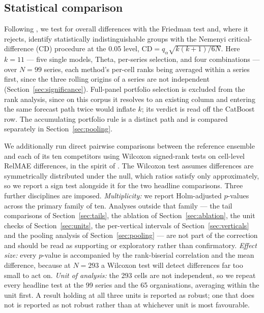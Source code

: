 \documentclass[11pt]{article}
\begin{document}
\subsection{Statistical comparison}
\label{sec:stats}

Following \citet{demsar2006}, we test for overall differences with the Friedman test and, where it rejects, identify statistically indistinguishable groups with the Nemenyi critical-difference (CD) procedure at the 0.05 level, $\mathrm{CD} = q_\alpha \sqrt{k(k+1)/6N}$. Here $k = 11$ --- five single models, Theta, per-series selection, and four combinations --- over $N = 99$ series, each method's per-cell ranks being averaged within a series first, since the three rolling origins of a series are not independent (Section~\ref{sec:significance}). Full-panel portfolio selection is excluded from the rank analysis, since on this corpus it resolves to an existing column and entering the same forecast path twice would inflate $k$; its verdict is read off the CatBoost row. The accumulating portfolio rule is a distinct path and is compared separately in Section~\ref{sec:pooling}.

We additionally run direct pairwise comparisons between the reference ensemble and each of its ten competitors using Wilcoxon signed-rank tests on cell-level RelMAE differences, in the spirit of \citet{diebold1995}. The Wilcoxon test assumes differences are symmetrically distributed under the null, which ratios satisfy only approximately, so we report a sign test alongside it for the two headline comparisons. Three further disciplines are imposed. \emph{Multiplicity:} we report Holm-adjusted $p$-values across the primary family of ten. Analyses outside that family --- the tail comparisons of Section~\ref{sec:tails}, the ablation of Section~\ref{sec:ablation}, the unit checks of Section~\ref{sec:units}, the per-vertical intervals of Section~\ref{sec:verticals} and the pooling analysis of Section~\ref{sec:pooling} --- are not part of the correction and should be read as supporting or exploratory rather than confirmatory. \emph{Effect size:} every $p$-value is accompanied by the rank-biserial correlation and the mean difference, because at $N = 293$ a Wilcoxon test will detect differences far too small to act on. \emph{Unit of analysis:} the 293 cells are not independent, so we repeat every headline test at the 99 series and the 65 organisations, averaging within the unit first. A result holding at all three units is reported as robust; one that does not is reported as not robust rather than at whichever unit is most favourable.
\end{document}
